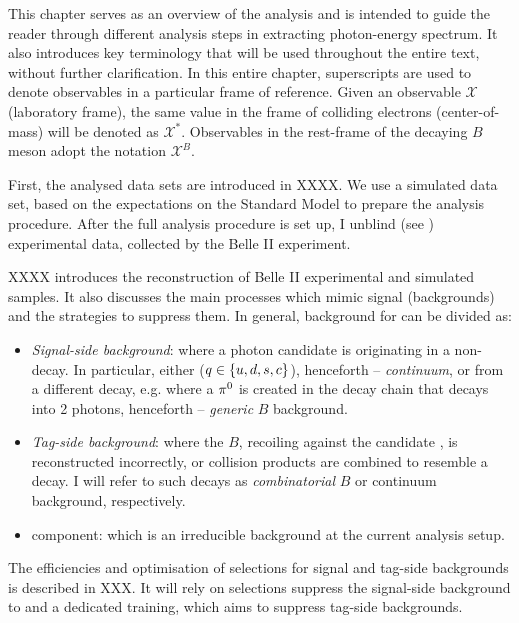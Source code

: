 This chapter serves as an overview of the analysis
and is intended to guide the reader through different analysis steps in extracting \BtoXsgamma photon-energy spectrum.
It also introduces key terminology that will be used throughout the entire text, without further clarification.
In this entire chapter, superscripts are used to denote observables in a particular frame of reference.
Given an observable $\mathcal{X}$ (laboratory frame), the same value in the frame of colliding electrons (center-of-mass) will be denoted as $\mathcal{X}^*$.
Observables in the rest-frame of the decaying $B$ meson adopt the notation $\mathcal{X}^B$.

First, the analysed data sets are introduced in XXXX.
We use a simulated data set, based on the expectations on the Standard Model to prepare the analysis procedure.
After the full analysis procedure is set up, I unblind (see ) experimental data, collected by the Belle II experiment.

XXXX introduces the reconstruction of Belle II experimental and simulated \BtoXsgamma samples.
It also discusses the main processes which mimic \BtoXsgamma signal (backgrounds) and the strategies to suppress them.
In general, background for \BtoXsgamma can be divided as:
\begin{itemize}
    \item \textit{Signal-side background}: where a photon candidate is originating in a non-\BtoXsgamma decay.
    In particular, either \epem\ra\qqbar ($q\in\{u,d,s,c\}$), henceforth -- \textit{continuum}, or from a different \B decay, e.g. where a $\pi^0$ is created in the decay chain that decays into 2 photons, henceforth -- \textit{generic} $B$ background.
    \item \textit{Tag-side background}: where the $B$, recoiling against the candidate \BtoXsgamma, is reconstructed incorrectly, or \epem\ra\qqbar collision products are combined to resemble a \B decay.
    I will refer to such decays as \textit{combinatorial} $B$ or continuum background, respectively.
    \item \BtoXdgamma component: which is an irreducible background at the current analysis setup. 
\end{itemize}

The efficiencies and optimisation of selections for signal and tag-side backgrounds is described in XXX.
It will rely on selections suppress the signal-side background to and a dedicated \BDT training, which aims to suppress tag-side backgrounds.

